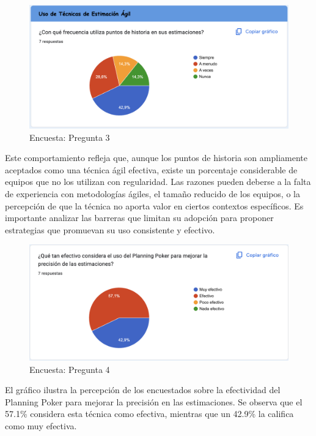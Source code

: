\FloatBarrier
\begin{figure}[h!]
    \centering
    \includegraphics[width=1\textwidth]{images/question_3.png}
    \caption{Encuesta: Pregunta 3}
    \label{fig:question_3}
\end{figure}

\FloatBarrier
Este comportamiento refleja que, aunque los puntos de historia son ampliamente aceptados como una técnica ágil efectiva, existe un porcentaje considerable de equipos que no los utilizan con regularidad. Las razones pueden deberse a la falta de experiencia con metodologías ágiles, el tamaño reducido de los equipos, o la percepción de que la técnica no aporta valor en ciertos contextos específicos. Es importante analizar las barreras que limitan su adopción para proponer estrategias que promuevan su uso consistente y efectivo.

\FloatBarrier
\begin{figure}[h!]
    \centering
    \includegraphics[width=1\textwidth]{images/question_4.png}
    \caption{Encuesta: Pregunta 4}
    \label{fig:question_4}
\end{figure}


\FloatBarrier
El gráfico ilustra la percepción de los encuestados sobre la efectividad del Planning Poker para mejorar la precisión en las estimaciones. Se observa que el 57.1\% considera esta técnica como efectiva, mientras que un 42.9\% la califica como muy efectiva.

